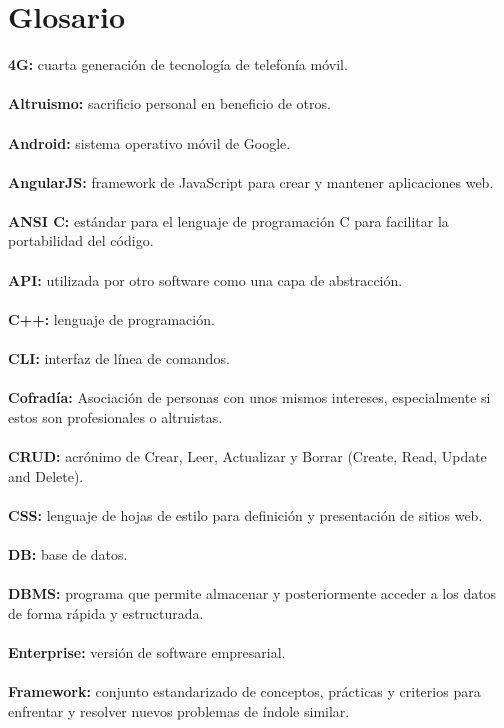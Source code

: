 \documentclass[a4paper,openright,11pt]{article}
\begin{document}
\section{Glosario}
\noindent 
\textbf{4G:} cuarta generación de tecnología de telefonía móvil.\\ \\
\textbf{Altruismo:} sacrificio personal en beneficio de otros. \\\\
\textbf{Android:} sistema operativo móvil de Google. \\\\
\textbf{AngularJS:} framework de JavaScript para crear y mantener aplicaciones web.\\ \\
\textbf{ANSI C:} estándar para el lenguaje de programación C para facilitar la portabilidad del código.\\ \\
\textbf{API:} utilizada por otro software como una capa de abstracción. \\\\
\textbf{C++:} lenguaje de programación.\\\\
\textbf{CLI:} interfaz de línea de comandos.\\ \\
\textbf{Cofradía:} Asociación de personas con unos mismos intereses, especialmente si estos son profesionales o altruistas.\\\\
\textbf{CRUD:} acrónimo de Crear, Leer, Actualizar y Borrar (Create, Read, Update and Delete).\\ \\
\textbf{CSS:} lenguaje de hojas de estilo para definición y presentación de sitios web.\\ \\
\textbf{DB:} base de datos. \\\\
\textbf{DBMS:} programa que permite almacenar y posteriormente acceder a los datos de forma rápida y estructurada.\\\\
\textbf{Enterprise:} versión de software empresarial.\\ \\
\textbf{Framework:} conjunto estandarizado de conceptos, prácticas y criterios para enfrentar y resolver nuevos problemas de índole similar. \\\\
\end{document}
